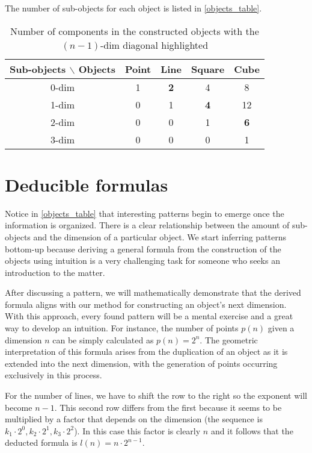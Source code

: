 \documentclass{article}
\begin{document}
	The number of sub-objects for each object is listed in \autoref{objects_table}.

	\begin{table}[ht]
		\centering
		\begin{tabular}{||c | c c c c||}
			\hline
			Sub-objects $\backslash$ Objects & Point & Line & Square & Cube\\\hline\hline
			0-dim & 1 & \textbf{2} & 4 & 8\\\hline
			1-dim & 0 & 1 & \textbf{4} & 12\\\hline
			2-dim & 0 & 0 & 1 & \textbf{6}\\\hline
			3-dim & 0 & 0 & 0 & 1\\\hline
		\end{tabular}
		\caption{Number of components in the constructed objects with the $(n-1)$-dim diagonal highlighted \cite{coxeter1973regular}}
		\label{objects_table}
	\end{table}
	
	\section{Deducible formulas \label{sec:deducible}}
	
	Notice in \autoref{objects_table} that interesting patterns begin to emerge once the information is organized. There is a clear relationship between the amount of sub-objects and the dimension of a particular object. We start inferring patterns bottom-up because deriving a general formula from the construction of the objects using intuition is a very challenging task for someone who seeks an introduction to the matter.
	
	After discussing a pattern, we will mathematically demonstrate that the derived formula aligns with our method for constructing an object's next dimension. With this approach, every found pattern will be a mental exercise and a great way to develop an intuition. For instance, the number of points $p(n)$ given a dimension $n$ can be simply calculated as $p(n) = 2^{n}$. The geometric interpretation of this formula arises from the duplication of an object as it is extended into the next dimension, with the generation of points occurring exclusively in this process.
	
	For the number of lines, we have to shift the row to the right so the exponent will become $n-1$. This second row differs from the first because it seems to be multiplied by a factor that depends on the dimension (the sequence is $k_1 \cdot 2^{0}, k_2 \cdot 2^{1}, k_3 \cdot 2^{2}$). In this case this factor is clearly $n$ and it follows that the deducted formula is $l(n) = n \cdot 2^{n-1}$.
	
\end{document}
